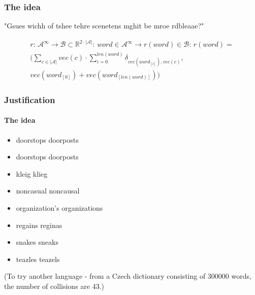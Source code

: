 \documentclass[compress,red]{beamer}
\begin{document}
\begin{frame}\frametitle{The idea}


\begin{center}
"Gsues wichh of tshee tehre scenetens mghit be mroe rdbleaae?"

\begin{multline*}
r:\,\mathcal{A}^{\infty}\rightarrow\mathcal{B}\subset\mathbb{R}^{2\cdot|\mathcal{A}|}:\,word\in\mathcal{A}^{\infty}\rightarrow r(word)\in\mathcal{B}:\,r(word)= \\
( \sum_{c\in|\mathcal{A}|}vec(c)\cdot\sum_{i=0}^{len(word)}\delta_{vec(word_{[i]}),vec(c)}, \\  vec(word_{[0]})+vec(word_{[len(word)]}) )
\end{multline*} 


\end{center}

\end{frame}

%
%
%
\begin{frame}\frametitle{Justification}
\framesubtitle{The idea}

\begin{itemize}
\item doorstops doorposts 
\item doorstops doorposts 
\item kleig klieg 
\item noncasual noncausal 
\item organization's organizations
\item regains reginas
\item snakes sneaks 
\item teazles teazels 
\end{itemize}
(To try another language - from a Czech dictionary consisting of 300000 words, the number of collisions are 43.)
\end{frame}
\end{document}
